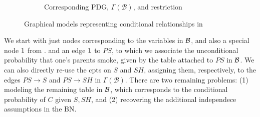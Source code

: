 \documentclass{article}
\newcommand{\MN}{PDG}
\numberwithin{equation}{section}
\begin{document}
\begin{example}[emulating a BN]
\begin{figure*}[ht!]
\begin{subfigure}[b]{0.5\textwidth}
{}
				\caption{Corresponding \MN, $\Gamma(\mathcal B)$, and restriction}
				\label{subfig:smoking-pdg}
			\end{subfigure}
		
			\caption{Graphical models representing conditional relationships in }
			\label{fig:smoking-bn+pdg}
		\end{figure*}
		
%

		We start with just nodes corresponding to the variables in $\cal B$, and also a special node $\sf 1$ from . and an edge ${\sf 1}$ to $\mathit{PS}$, to which we associate the unconditional probability that one's parents smoke, given by the table attached to $\mathit{PS}$ in $\cal B$.
		We can also directly re-use the cpts on $S$ and $\mathit{SH}$, assigning them, respectively, to the edges $PS \to S$ and $PS \to SH$ in $\Gamma(\mathcal B)$. There are two remaining problems: (1) modeling the remaining table in $\cal B$, which corresponds to the conditional probability of $C$ given $S,SH$, and (2) recovering the additional independece assumptions in the BN.
		

\end{example}
\end{document}

